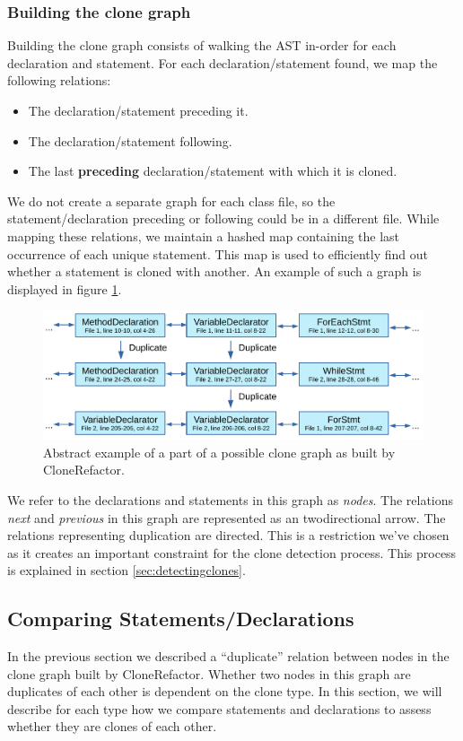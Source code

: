 \subsubsection{Building the clone graph}\label{sec:buildingclonegraph}
Building the clone graph consists of walking the AST in-order for each declaration and statement. For each declaration/statement found, we map the following relations:
\begin{itemize}
  \item The declaration/statement preceding it.
  \item The declaration/statement following.
  \item The last \textbf{preceding} declaration/statement with which it is cloned.
\end{itemize}
We do not create a separate graph for each class file, so the statement/declaration preceding or following could be in a different file. While mapping these relations, we maintain a hashed map containing the last occurrence of each unique statement. This map is used to efficiently find out whether a statement is cloned with another. An example of such a graph is displayed in figure \ref{fig:clonegraphsimple}.

\begin{figure}[H]
  \centering
  \includegraphics[width=1\columnwidth]{img/CodeGraph2}
  \caption{Abstract example of a part of a possible clone graph as built by CloneRefactor.}
  \label{fig:clonegraphsimple}
\end{figure}

We refer to the declarations and statements in this graph as \textit{nodes}. The relations \textit{next} and \textit{previous} in this graph are represented as an twodirectional arrow. The relations representing duplication are directed. This is a restriction we've chosen as it creates an important constraint for the clone detection process. This process is explained in section \ref{sec:detectingclones}.

\subsection{Comparing Statements/Declarations} \label{sec:comparingstuff}
In the previous section we described a ``duplicate'' relation between nodes in the clone graph built by CloneRefactor. Whether two nodes in this graph are duplicates of each other is dependent on the clone type. In this section, we will describe for each type how we compare statements and declarations to assess whether they are clones of each other.

